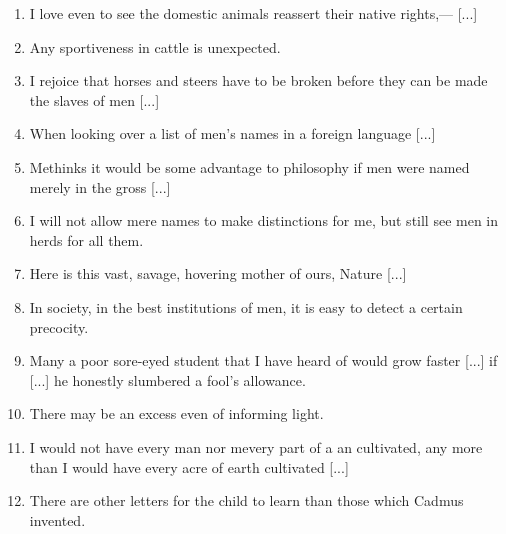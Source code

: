 \documentclass[twoside,openright,10pt]{memoir} %
\begin{document}
\begin{enumerate}
\item I love even to see the domestic animals reassert their native rights,— [...] \EBGaramond{}\textlangle\normalfont {} \thecount \EBGaramond{}\textrangle \normalfont
\item Any sportiveness in cattle is unexpected. \EBGaramond{}\textlangle\normalfont {} \thecount \EBGaramond{}\textrangle \normalfont
\item I rejoice that horses and steers have to be broken before they can be made the slaves of men [...] \EBGaramond{}\textlangle\normalfont {} \thecount \EBGaramond{}\textrangle \normalfont
\item When looking over a list of men’s names in a foreign language [...] \EBGaramond{}\textlangle\normalfont {} \thecount \EBGaramond{}\textrangle \normalfont
\item Methinks it would be some advantage to philosophy if men were named merely in the gross [...] \EBGaramond{}\textlangle\normalfont {} \thecount \EBGaramond{}\textrangle \normalfont
\item I will not allow mere names to make distinctions for me, but still see men in herds for all them. \EBGaramond{}\textlangle\normalfont {} \thecount \EBGaramond{}\textrangle \normalfont
\item Here is this vast, savage, hovering mother of ours, Nature [...] \EBGaramond{}\textlangle\normalfont {} \thecount \EBGaramond{}\textrangle \normalfont
\item In society, in the best institutions of men, it is easy to detect a certain precocity. \EBGaramond{}\textlangle\normalfont {} \thecount \EBGaramond{}\textrangle \normalfont
\item Many a poor sore-eyed student that I have heard of would grow faster [...] if [...] he honestly slumbered a fool’s allowance. \EBGaramond{}\textlangle\normalfont {} \thecount \EBGaramond{}\textrangle \normalfont
\item There may be an excess even of informing light. \EBGaramond{}\textlangle\normalfont {} \thecount \EBGaramond{}\textrangle \normalfont
\item I would not have every man nor mevery part of a an cultivated, any more than I would have every acre of earth cultivated [...] \EBGaramond{}\textlangle\normalfont {} \thecount \EBGaramond{}\textrangle \normalfont
\item There are other letters for the child to learn than those which Cadmus invented. \EBGaramond{}\textlangle\normalfont {} \thecount \EBGaramond{}\textrangle \normalfont

\end{enumerate}
\end{document}

